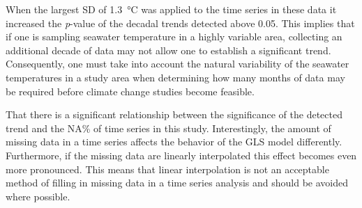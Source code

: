 \documentclass[]{ametsoc}
\begin{document}
When the largest SD of \SI{1.3}{\degreeCelsius} was applied to the time series in these data it increased the \emph{p}-value of the decadal trends detected above 0.05. This implies that if one is sampling seawater temperature in a highly variable area, collecting an additional decade of data may not allow one to establish a significant trend. Consequently, one must take into account the natural variability of the seawater temperatures in a study area when determining how many months of data may be required before climate change studies become feasible.

That there is a significant relationship between the significance of the detected trend and the NA\% of time series in this study. Interestingly, the amount of missing data in a time series affects the behavior of the GLS model differently. Furthermore, if the missing data are linearly interpolated this effect becomes even more pronounced. This means that linear interpolation is not an acceptable method of filling in missing data in a time series analysis and should be avoided where possible.
\end{document}
